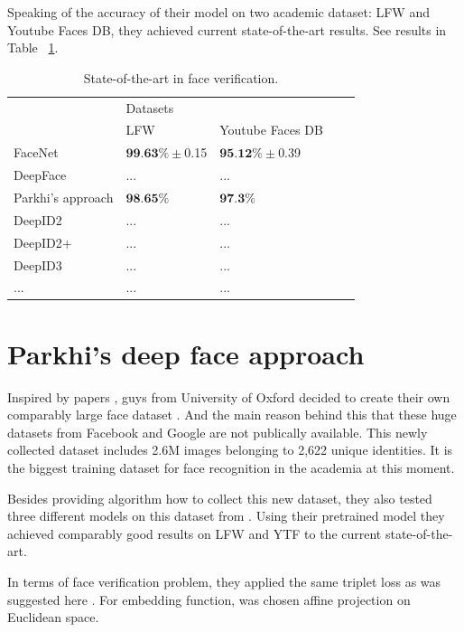 \documentclass[paper=a4, fontsize=11pt]{scrartcl} %
\numberwithin{equation}{section} %
\numberwithin{figure}{section} %
\numberwithin{table}{section} %
\begin{document}
Speaking of the accuracy of their model on two academic dataset: LFW and Youtube Faces DB, they achieved current state-of-the-art results. See results in Table ~\ref{tab:table2}.

\begin{table}[!htb]
\centering
\begin{tabular}{|l|l|l|l|l|}
\hline
\multirow{2}{*}{} Models & \multicolumn{2}{l|}{Datasets} \\ \cline{2-3} 
                  &   LFW  &  Youtube Faces DB        \\ \hline
               FaceNet   &  $\textbf{99.63}\% \pm$0.15   &   $\textbf{95.12}\% \pm$0.39       \\ \hline
               DeepFace &  ...   &  ...       \\ \hline
               Parkhi's approach		& $\textbf{98.65}\%$	 & $\textbf{97.3}\%$ \\ \hline
               DeepID2 &  ...   &  ...       \\ \hline
               DeepID2+ &  ...   &  ...       \\ \hline
               DeepID3 &  ...   &  ...       \\ \hline
               ... & ... & ... \\ \hline
\end{tabular}
\caption{State-of-the-art in face verification.}
\label{tab:table2}
\end{table}

\section{Parkhi's deep face approach}

Inspired by papers \cite{taigman2014deepface, schroff2015facenet}, guys from University of Oxford decided to create their own comparably large face dataset \cite{parkhi2015deep}. And the main reason behind this that these huge datasets from Facebook and Google are not publically available. This newly collected dataset includes 2.6M images belonging to 2,622 unique identities. It is the biggest training dataset for face recognition in the academia at this moment. \par
Besides providing algorithm how to collect this new dataset, they also tested three different models on this dataset from \cite{simonyan2014very}. Using their pretrained model they achieved comparably good results on LFW and YTF to the current state-of-the-art.\par
In terms of face verification problem, they applied the same triplet loss as was suggested here \cite{schroff2015facenet}. For embedding function, was chosen affine projection on Euclidean space.
\end{document}
